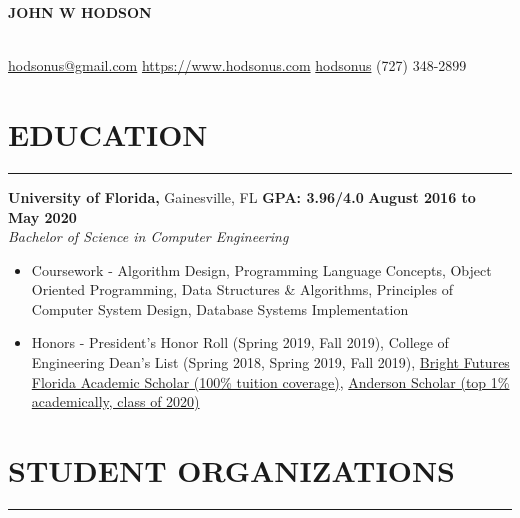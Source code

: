 \documentclass[11pt]{article} %
\begin{document}
	
	\noindent\centerline{ \huge\textbf{JOHN W HODSON}}\\
	
	\noindent
	\faEnvelopeSquare \space\href{mailto:hodsonus@gmail.com}{hodsonus@gmail.com} \hspace*{\fill}
	\faHome \space \href{https://www.hodsonus.com}{https://www.hodsonus.com} \hspace*{\fill}
	\faGithub \space \href{https://github.com/hodsonus}{hodsonus} \hspace*{\fill}
	\faMobilePhone \space (727) 348-2899\\
	
	\section*{EDUCATION}
		\hrule \relax
		\vspace{.4cm}
		
		\noindent \textbf{University of Florida,} Gainesville, FL
		\hfill\textbf{GPA: 3.96/4.0}
		\hfill\textbf{August 2016 to May 2020}\\
		\textit{Bachelor of Science in Computer Engineering}
		\begin{itemize}[noitemsep,nolistsep, label = {-}]
			\item  Coursework - 
											Algorithm Design,
											Programming Language Concepts,
											Object Oriented Programming,
											Data Structures \& Algorithms,
											Principles of Computer System Design,
											Database Systems Implementation
			\item  Honors - 
											President's Honor Roll (Spring 2019, Fall 2019),
											College of Engineering Dean\rq s List (Spring 2018, Spring 2019, Fall 2019),
											\href{https://www.sfa.ufl.edu/types-of-aid/bright-futures/}{Bright Futures Florida Academic Scholar (100\% tuition coverage)},
											\href{https://sites.clas.ufl.edu/clas-main/undergraduate/anderson-scholars/anderson-scholars-listing/}{Anderson Scholar (top 1\% academically, class of 2020)}
		\end{itemize}
		
		\vspace{.20cm}
		
	\section*{STUDENT ORGANIZATIONS}
	\hrule \relax
	\vspace{.4cm}
		
\end{document}
